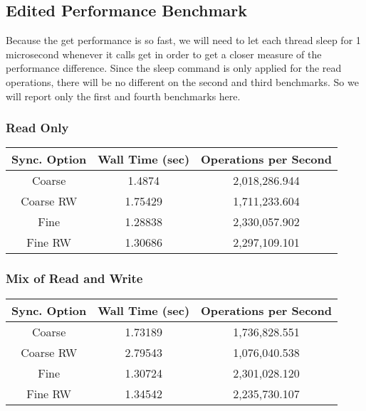 \documentclass[11pt]{article}
\begin{document}
\subsection{Edited Performance Benchmark}
Because the get performance is so fast, we will need to let each thread sleep for 1 microsecond whenever it calls get in order to get a closer measure of the performance difference. Since the sleep command is only applied for the read operations, there will be no different on the second and third benchmarks. So we will report only the first and fourth benchmarks here.
\subsubsection{Read Only}
\begin{table}[H]
	\centering
	\begin{tabular}{|c|c|c|}
		\hline
		Sync. Option &Wall Time (sec)	&Operations per Second	\\
		\hline
		Coarse &1.4874	&2,018,286.944\\
		\hline
		Coarse RW &1.75429 &1,711,233.604\\
		\hline
		Fine	&1.28838	&2,330,057.902\\
		\hline
		Fine RW	&1.30686	&2,297,109.101\\
		\hline
	\end{tabular}
\end{table}
\subsubsection{Mix of Read and Write}
\begin{table}[H]
	\centering
	\begin{tabular}{|c|c|c|}
		\hline
		Sync. Option &Wall Time (sec)	&Operations per Second	\\
		\hline
		Coarse &1.73189	&1,736,828.551\\
		\hline
		Coarse RW &2.79543 &1,076,040.538\\
		\hline
		Fine	&1.30724	&2,301,028.120\\
		\hline
		Fine RW	&1.34542	&2,235,730.107\\
		\hline
	\end{tabular}
\end{table}
\end{document}
